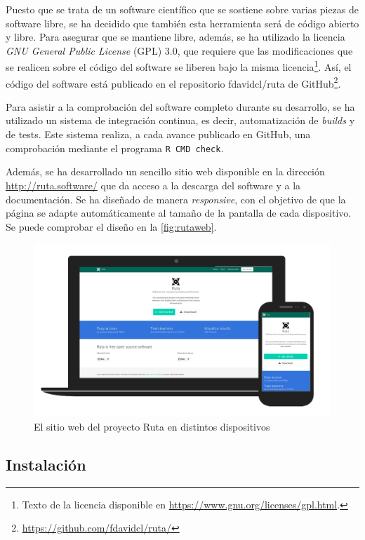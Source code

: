 Puesto que se trata de un software científico que se sostiene sobre varias piezas de software libre, se ha decidido que también esta herramienta será de código abierto y libre. Para asegurar que se mantiene libre, además, se ha utilizado la licencia \textit{GNU General Public License} (GPL) 3.0, que requiere que las modificaciones que se realicen sobre el código del software se liberen bajo la misma licencia\footnote{Texto de la licencia disponible en \url{https://www.gnu.org/licenses/gpl.html}.}. Así, el código del software está publicado en el repositorio fdavidcl/ruta de GitHub\footnote{\url{https://github.com/fdavidcl/ruta/}}.

Para asistir a la comprobación del software completo durante su desarrollo, se ha utilizado un sistema de integración continua, es decir, automatización de \textit{builds} y de tests. Este sistema realiza, a cada avance publicado en GitHub, una comprobación mediante el programa \texttt{R CMD check}.

Además, se ha desarrollado un sencillo sitio web disponible en la dirección \url{http://ruta.software/} que da acceso a la descarga del software y a la documentación. Se ha diseñado de manera \emph{responsive}, con el objetivo de que la página se adapte automáticamente al tamaño de la pantalla de cada dispositivo. Se puede comprobar el diseño en la \autoref{fig:rutaweb}.

\begin{figure}[hbtp]
  \centering
  \includegraphics[width=\textwidth]{images/responsive_web.png}
  \caption[Sitio web de Ruta]{El sitio web del proyecto Ruta en distintos dispositivos}
  \label{fig:rutaweb}
\end{figure}

\subsection{Instalación}

